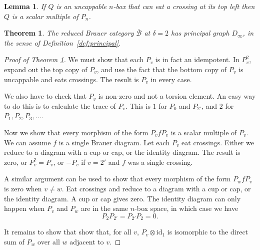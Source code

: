 \documentclass[10pt,a4paper]{amsart}
\newtheorem{theorem}{Theorem}
\newtheorem{lemma}{Lemma}
\newcommand{\id}{\mathrm{id}}
\begin{document}
\begin{lemma}
\label{lem:uniqueuptoscalar}
If $Q$ is an uncappable $n$-box that can eat a crossing at its top left
then $Q$ is a scalar multiple of $P_n$.
\end{lemma}

\begin{theorem}
\label{thm:principal}
The reduced Brauer category $\overline{\mathcal{B}}$ at
$\delta=2$ has principal graph $D_\infty$, in the sense of
Definition~\ref{def:principal}.
\end{theorem}

\begin{proof}[Proof of Theorem \ref{thm:principal}]
We must show that each $P_v$ is in fact an idempotent.  In $P_v^2$, expand
out the top copy of $P_v$, and use the fact that the bottom copy of $P_v$
is uncappable and eats crossings.  The result is $P_v$ in every case.

We also have to check that $P_v$ is non-zero and not a torsion element.
An easy way to do this is to calculate the trace of $P_v$.  This is $1$
for $P_0$ and $P_{2'}$, and $2$ for $P_1,P_2,P_3,\dots$.

Now we show that every morphism of the form $P_vfP_v$ is a scalar
multiple of $P_v$.  We can assume $f$ is a single Brauer diagram.
Let each $P_v$ eat crossings.  Either we reduce to a diagram with a cup
or cap, or the identity diagram.  The result is zero, or $P_v^2=P_v$,
or $-P_v$ if $v=2'$ and $f$ was a single crossing.

A similar argument can be used to show that every morphism of the form
$P_wfP_v$ is zero when $v \neq w$.  Eat crossings and reduce to a diagram
with a cup or cap, or the identity diagram.  A cup or cap gives zero.
The identity diagram can only happen when $P_v$ and $P_w$ are in the
same $n$-box space, in which case we have
$$P_2 P_{2'} = P_{2'} P_2 = 0.$$

It remains to show that show that, for all $v$, $P_v \otimes \id_1$
is isomorphic to the direct sum of $P_w$ over all $w$ adjacent to $v$.


\end{proof}
\end{document}
